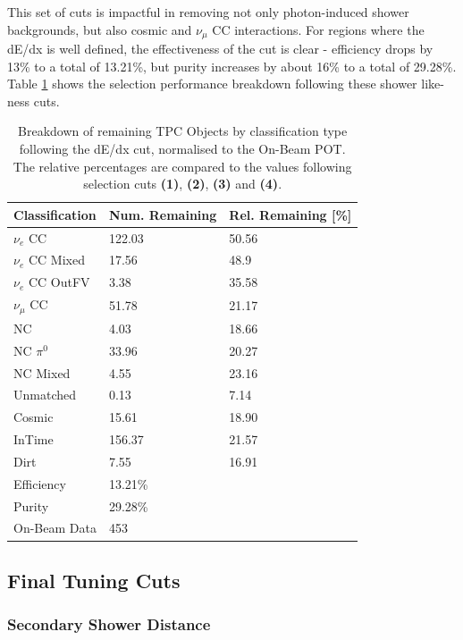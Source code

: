 This set of cuts is impactful in removing not only photon-induced shower backgrounds, but also cosmic and $\nu_{\mu}$ CC interactions. For regions where the dE/dx is well defined, the effectiveness of the cut is clear - efficiency drops by 13\% to a total of 13.21\%, but purity increases by about 16\% to a total of 29.28\%. Table \ref{selection_summary_table_dedx} shows the selection performance breakdown following these shower like-ness cuts.

\begin{table}[htbp]
\center
\begin{tabular}{l | l l }
Classification & Num. Remaining & Rel. Remaining [\%] \\
\hline
$\nu_e$ CC & 122.03 & 50.56\\
$\nu_e$ CC Mixed & 17.56 & 48.9\\
$\nu_e$ CC OutFV & 3.38 & 35.58\\
$\nu_{\mu}$ CC & 51.78 & 21.17\\
NC & 4.03 & 18.66\\
NC $\pi^0$ & 33.96 & 20.27\\
NC Mixed & 4.55 & 23.16\\
Unmatched & 0.13 & 7.14\\
Cosmic & 15.61 & 18.90\\
InTime & 156.37 & 21.57\\
Dirt & 7.55 & 16.91\\
\hline
\hline
Efficiency & 13.21\%\\
Purity & 29.28\%\\
\hline
On-Beam Data & 453\\
\hline
\end{tabular}
\caption{Breakdown of remaining TPC Objects by classification type following the dE/dx cut, normalised to the On-Beam POT. The relative percentages are compared to the values following selection cuts \textbf{(1)}, \textbf{(2)}, \textbf{(3)} and \textbf{(4)}. }\label{selection_summary_table_dedx}
\end{table}

\FloatBarrier
\subsection{Final Tuning Cuts}

\subsubsection{Secondary Shower Distance}

